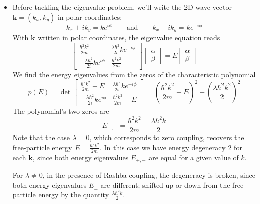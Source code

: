 \documentclass[11pt, a4paper]{article}
\newcommand{\eqtext}[1]{\qquad \text{#1} \qquad}
\renewcommand{\vec}[1]{\bm{#1}} %
\renewcommand{\k}{\vec{k}}  %
\begin{document}
\begin{itemize}
	\item Before tackling the eigenvalue problem, we'll write the 2D wave vector $ \vec{k} = (k_{x}, k_{y}) $ in polar coordinates:
	\begin{equation*}
		k_{x} + ik_{y} = ke^{i\phi} \eqtext{and} k_{x} - ik_{y} = ke^{-i\phi}
	\end{equation*}
	With $ \k $ written in polar coordinates, the eigenvalue equation reads
	\begin{equation*}
		\begin{bmatrix}
		\frac{\hbar^{2}k^{2}}{2m} & \frac{\lambda \hbar^{2}}{2i}ke^{-i\phi} \\[1mm]
		-\frac{\lambda \hbar^{2}}{2i}ke^{i\phi} & \frac{\hbar^{2}k^{2}}{2m}
		\end{bmatrix}
		\begin{bmatrix}
			\alpha\\
			\beta
		\end{bmatrix}
		= E
		\begin{bmatrix}
			\alpha\\
			\beta
		\end{bmatrix}
	\end{equation*}
	We find the energy eigenvalues from the zeros of the characteristic polynomial
	\begin{equation*}
		p(E) = \det 
		\begin{bmatrix}
		\frac{\hbar^{2}k^{2}}{2m} - E & \frac{\lambda \hbar^{2}}{2i}ke^{-i\phi} \\[1mm]
		-\frac{\lambda \hbar^{2}}{2i}ke^{i\phi} & \frac{\hbar^{2}k^{2}}{2m} - E
		\end{bmatrix}
		= \left( \frac{\hbar^{2}k^{2}}{2m} - E\right)^{2} - \left(\frac{\lambda \hbar^{2}k^{2}}{2}\right)^{2} 
	\end{equation*}	
	The polynomial's two zeros are
	\begin{equation*}
		E_{+,-} = \frac{\hbar^{2}k^{2}}{2m} \pm \frac{\lambda \hbar^{2}k}{2}
	\end{equation*}
	Note that the case $ \lambda = 0 $, which corresponds to zero coupling, recovers the free-particle energy $ E = \frac{\hbar^{2}k^{2}}{2m} $. In this case we have energy degeneracy $ 2 $ for each $ \k $, since both energy eigenvalues $ E_{+,-} $ are equal for a given value of $ k $.
	
	For $ \lambda \neq 0 $, in the presence of Rashba coupling, the degeneracy is broken, since both energy eigenvalues $ E_{\pm} $ are different; shifted up or down from the free particle energy by the quantity $ \frac{\lambda \hbar^{2}k}{2} $.
	

\end{itemize}
\end{document}
